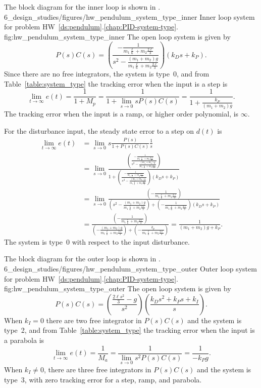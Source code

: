 
The block diagram for the inner loop is shown in .
	{6_design_studies/figures/hw_pendulum_system_type_inner}
	{Inner loop system for problem HW~\ref{ds:pendulum}.\ref{chap:PID-system-type}.}
	{fig:hw_pendulum_system_type_inner}
The open loop system is given by
\[
P(s)C(s) = \left(\frac{-\frac{1}{m_1\frac{\ell}{6}+m_2\frac{2\ell}{3}}}{s^2-\frac{(m_1+m_2)g}{m_1\frac{\ell}{6}+m_2\frac{2\ell}{3}}}\right)\left(k_Ds+k_P\right).
\]
Since there are no free integrators, the system is type~0, and from Table~\ref{table:system_type} the tracking error when the input is a step is \[
\lim_{t\to\infty}e(t) = \frac{1}{1+M_p} = \frac{1}{1+\lim_{s\to 0} sP(s)C(s)} = \frac{1}{1+\frac{k_P}{(m_1+m_2)g}}.
\]
The tracking error when the input is a ramp, or higher order polynomial, is $\infty$.

For the disturbance input, the steady state error to a step on $d(t)$ is
\begin{align*}
\lim_{t\to\infty}e(t) &= \lim_{s\to 0}s\frac{P(s)}{1+P(s)C(s)}\frac{1}{s} \\
&= \lim_{s\to 0} \frac{\left(\frac{-\frac{1}{m_1\frac{\ell}{6}+m_2\frac{2\ell}{3}}}{s^2-\frac{(m_1+m_2)g}{m_1\frac{\ell}{6}+m_2\frac{2\ell}{3}}}\right)}{1+\left(\frac{-\frac{1}{m_1\frac{\ell}{6}+m_2\frac{2\ell}{3}}}{s^2-\frac{(m_1+m_2)g}{m_1\frac{\ell}{6}+m_2\frac{2\ell}{3}}}\right)\left(k_Ds+k_P\right)} \\
&= \lim_{s\to 0} \frac{\left(-\frac{1}{m_1\frac{\ell}{6}+m_2\frac{2\ell}{3}}\right)}{\left(s^2-\frac{(m_1+m_2)g}{m_1\frac{\ell}{6}+m_2\frac{2\ell}{3}}\right)+\left(-\frac{1}{m_1\frac{\ell}{6}+m_2\frac{2\ell}{3}}\right)\left(k_Ds+k_P\right)} \\
&=\frac{\left(-\frac{1}{m_1\frac{\ell}{6}+m_2\frac{2\ell}{3}}\right)}{\left(-\frac{(m_1+m_2)g}{m_1\frac{\ell}{6}+m_2\frac{2\ell}{3}}\right)+\left(-\frac{k_p}{m_1\frac{\ell}{6}+m_2\frac{2\ell}{3}}\right)} 
= \frac{1}{(m_1+m_2)g+k_P}.
\end{align*}
The system is type~0 with respect to the input disturbance.

The block diagram for the outer loop is shown in .
	{6_design_studies/figures/hw_pendulum_system_type_outer}
	{Outer loop system for problem HW~\ref{ds:pendulum}.\ref{chap:PID-system-type}.}
	{fig:hw_pendulum_system_type_outer}
The open loop system is given by
\[
P(s)C(s) = \left(\frac{\frac{2\ell s^2}{3}-g}{s^2}\right)\left(\frac{k_Ds^2+k_Ps+k_I}{s}\right).
\]
When $k_I=0$ there are two free integrator in $P(s)C(s)$ and the system is type~2, and from Table~\ref{table:system_type} the tracking error when the input is a parabola is \[
\lim_{t\to\infty}e(t) = \frac{1}{M_a} = \frac{1}{\lim_{s\to 0} s^2P(s)C(s)} = \frac{1}{-k_Pg}.
\]
When $k_I\neq 0$, there are three free integrators in $P(s)C(s)$ and the system is type~3, with zero tracking error for a step, ramp, and parabola.

